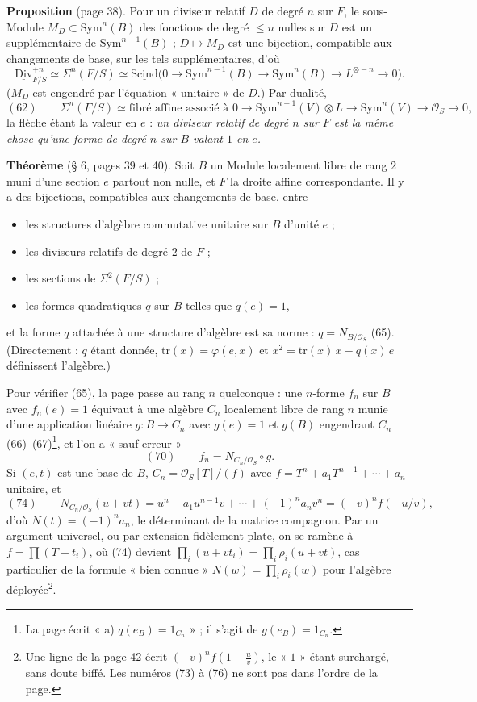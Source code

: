 \documentclass[11pt,a4paper]{article}
\begin{document}
\textbf{Proposition} (page 38). Pour un diviseur relatif $D$ de degré $n$ sur $F$,
le sous-Module $M_D \subset \mathrm{Sym}^n(B)$ des fonctions de degré $\leq n$ nulles
sur $D$ est un supplémentaire de $\mathrm{Sym}^{n-1}(B)$ ; $D \mapsto M_D$ est une
bijection, compatible aux changements de base, sur les tels supplémentaires,
d'où
\[
  \underline{\mathrm{Div}}^{+n}_{F/S} \simeq \Sigma^n(F/S) \simeq
  \underline{\mathrm{Scind}}\bigl(0 \to \mathrm{Sym}^{n-1}(B) \to \mathrm{Sym}^n(B) \to
  L^{\otimes -n} \to 0\bigr).
\]
($M_D$ est engendré par l'équation « unitaire » de $D$.) Par dualité,
\[
  (62) \qquad \Sigma^n(F/S) \simeq \text{fibré affine associé à } 0 \to
  \mathrm{Sym}^{n-1}(V) \otimes L \to \mathrm{Sym}^n(V) \to \mathcal{O}_S \to 0,
\]
la flèche étant la valeur en $e$ : \emph{un diviseur relatif de degré $n$ sur $F$
est la même chose qu'une forme de degré $n$ sur $B$ valant $1$ en $e$.}

\textbf{Théorème} (§ 6, pages 39 et 40). Soit $B$ un Module localement libre de
rang $2$ muni d'une section $e$ partout non nulle, et $F$ la droite affine
correspondante. Il y a des bijections, compatibles aux changements de base,
entre
\begin{itemize}
  \item[a)] les structures d'algèbre commutative unitaire sur $B$ d'unité $e$ ;
  \item[b)] les diviseurs relatifs de degré $2$ de $F$ ;
  \item[c)] les sections de $\Sigma^2(F/S)$ ;
  \item[d)] les formes quadratiques $q$ sur $B$ telles que $q(e) = 1$,
\end{itemize}
et la forme $q$ attachée à une structure d'algèbre est sa norme : $q = N_{B/\mathcal{O}_S}$
(65). (Directement : $q$ étant donnée, $\mathrm{tr}(x) = \varphi(e, x)$ et $x^2 =
\mathrm{tr}(x)\,x - q(x)\,e$ définissent l'algèbre.)

Pour vérifier (65), la page passe au rang $n$ quelconque : une $n$-forme $f_n$
sur $B$ avec $f_n(e) = 1$ équivaut à une algèbre $C_n$ localement libre de rang
$n$ munie d'une application linéaire $g : B \to C_n$ avec $g(e) = 1$ et $g(B)$
engendrant $C_n$ (66)--(67)\footnote{La page écrit « a) $q(e_B) = 1_{C_n}$ » ; il
s'agit de $g(e_B) = 1_{C_n}$.}, et l'on a « sauf erreur »
\[
  (70) \qquad f_n = N_{C_n/\mathcal{O}_S} \circ g .
\]
Si $(e, t)$ est une base de $B$, $C_n = \mathcal{O}_S[T]/(f)$ avec $f = T^n + a_1T^{n-1}
+ \cdots + a_n$ unitaire, et
\[
  (74) \qquad N_{C_n/\mathcal{O}_S}(u + vt) = u^n - a_1u^{n-1}v + \cdots +
  (-1)^n a_n v^n = (-v)^n f(-u/v),
\]
d'où $N(t) = (-1)^n a_n$, le déterminant de la matrice compagnon. Par un argument
universel, ou par extension fidèlement plate, on se ramène à $f = \prod (T -
t_i)$, où (74) devient $\prod_i (u + vt_i) = \prod_i \rho_i(u + vt)$, cas
particulier de la formule « bien connue » $N(w) = \prod_i \rho_i(w)$ pour
l'algèbre déployée\footnote{Une ligne de la page 42 écrit $(-v)^n f(1 -
\frac{u}{v})$, le « $1$ » étant surchargé, sans doute biffé. Les numéros (73) à
(76) ne sont pas dans l'ordre de la page.}.
\end{document}
